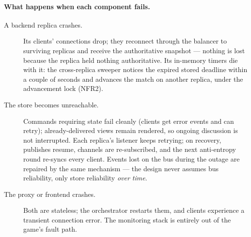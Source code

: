 \documentclass{scrartcl}
\begin{document}
\paragraph{What happens when each component fails.}
\begin{description}
      \item[A backend replica crashes.] Its clients' connections drop; they reconnect
            through the balancer to surviving replicas and receive the authoritative
            snapshot --- nothing is lost because the replica held nothing authoritative. Its
            in-memory timers die with it: the cross-replica sweeper notices the expired
            stored deadline within a couple of seconds and advances the match on another
            replica, under the advancement lock (NFR2).
      \item[The store becomes unreachable.] Commands requiring state fail cleanly
            (clients get error events and can retry); already-delivered views remain
            rendered, so ongoing discussion is not interrupted. Each replica's listener
            keeps retrying; on recovery, publishes resume, channels are re-subscribed, and
            the next anti-entropy round re-syncs every client. Events lost on the bus during
            the outage are repaired by the same mechanism --- the design never assumes bus
            reliability, only store reliability \emph{over time}.
      \item[The proxy or frontend crashes.] Both are stateless; the orchestrator
            restarts them, and clients experience a transient connection error. The
            monitoring stack is entirely out of the game's fault path.
\end{description}
\end{document}
